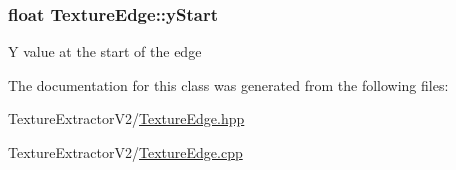 \subsubsection[{y\+Start}]{\setlength{\rightskip}{0pt plus 5cm}float Texture\+Edge\+::y\+Start}\label{class_texture_edge_aedbd23f82d3d7bcefa909a817ecd1352}
Y value at the start of the edge 

The documentation for this class was generated from the following files\+:\begin{DoxyCompactItemize}
\item 
Texture\+Extractor\+V2/\hyperlink{_texture_edge_8hpp}{Texture\+Edge.\+hpp}\item 
Texture\+Extractor\+V2/\hyperlink{_texture_edge_8cpp}{Texture\+Edge.\+cpp}\end{DoxyCompactItemize}
